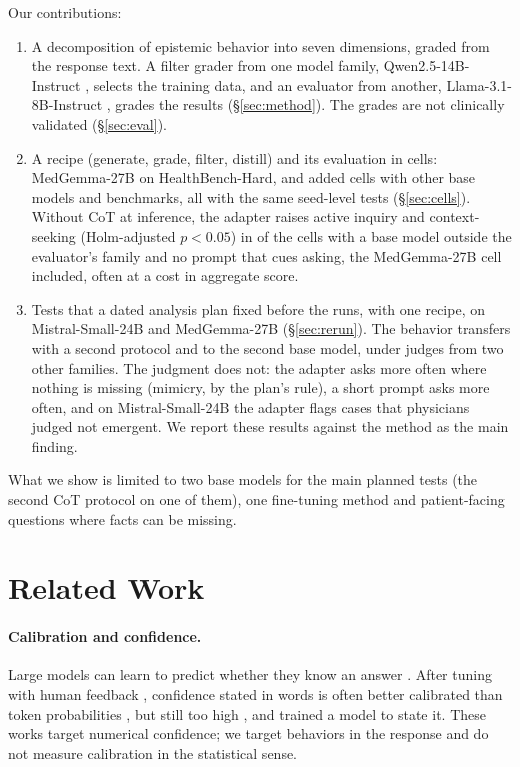 \documentclass{article}
\newcommand{\hbhard}{HealthBench-Hard}
\begin{document}
Our contributions:
\begin{enumerate}[leftmargin=*]
    \item A decomposition of epistemic behavior into seven dimensions, graded from the response
    text. A filter grader from one model family, Qwen2.5-14B-Instruct \citep{qwen2024qwen25},
    selects the training data, and an evaluator from another, Llama-3.1-8B-Instruct
    \citep{grattafiori2024llama3}, grades the results (\S\ref{sec:method}). The grades are not
    clinically validated (\S\ref{sec:eval}).
    \item A recipe (generate, grade, filter, distill) and its evaluation in \statCrossCells{} cells:
    MedGemma-27B \citep{medgemma2025} on \hbhard{}, and \statGroupAddedCells{} added cells with other
    base models and benchmarks, all with the same seed-level tests (\S\ref{sec:cells}). Without CoT at inference, the adapter raises active inquiry and
    context-seeking (Holm-adjusted $p < 0.05$) in \statGroupOutsideFamilyAskRose{} of the
    \statGroupOutsideFamilyCells{} cells with a base model outside the evaluator's family and no prompt that
    cues asking, the MedGemma-27B cell included, often at a cost in aggregate score.
    \item Tests that a dated analysis plan fixed before the runs, with one recipe, on
    Mistral-Small-24B and MedGemma-27B (\S\ref{sec:rerun}). The behavior transfers with a second
    protocol and to the second base model, under judges from two other families. The judgment does
    not: the adapter asks more often where nothing is missing (mimicry, by the plan's rule), a short
    prompt asks more often, and on Mistral-Small-24B the adapter flags cases that physicians judged
    not emergent. We report these results against the method as the main finding.
\end{enumerate}

\noindent What we show is limited to two base models for the main planned tests (the second CoT
protocol on one of them), one fine-tuning method and patient-facing questions where facts can be
missing.

\section{Related Work}
\label{sec:related}

\paragraph{Calibration and confidence.} Large models can learn to predict whether they know an
answer \citep{kadavath2022language}. After tuning with human feedback \citep{ouyang2022training},
confidence stated in words is often better calibrated than token probabilities
\citep{tian2023just}, but still too high \citep{xiong2024can}, and \citet{lin2022teaching} trained a
model to state it. These works target numerical confidence; we target behaviors in the response and
do not measure calibration in the statistical sense.
\end{document}
